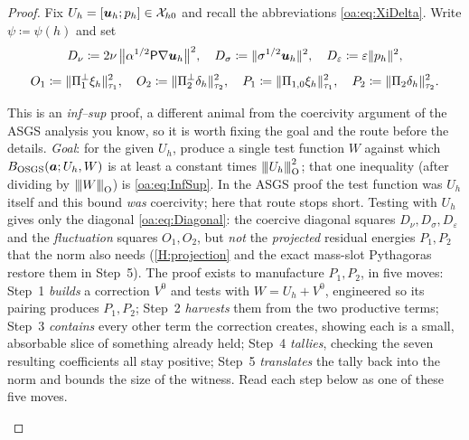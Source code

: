 \begin{proof}
Fix $U_h = [\boldsymbol{u}_h; p_h] \in \mathcal{X}_{h0}$ and recall the abbreviations \cref{oa:eq:XiDelta}.
Write $\psi \coloneqq \psi(h)$ and set
\[
  D_\nu \coloneqq 2\nu\,\bigl\lVert \alpha^{1/2}\mathsf{P}\nabla\boldsymbol{u}_h \bigr\rVert^2,
  \quad
  D_\sigma \coloneqq \lVert \sigma^{1/2}\boldsymbol{u}_h \rVert^2,
  \quad
  D_\varepsilon \coloneqq \varepsilon\lVert p_h \rVert^2,
\]
\[
  O_1 \coloneqq \lVert \Pi_{1}^{\perp}\xi_h \rVert_{\tau_1}^2,
  \quad
  O_2 \coloneqq \lVert \Pi_{2}^{\perp}\delta_h \rVert_{\tau_2}^2,
  \quad
  P_1 \coloneqq \lVert \Pi_{1,0}\xi_h \rVert_{\tau_1}^2,
  \quad
  P_2 \coloneqq \lVert \Pi_{2}\delta_h \rVert_{\tau_2}^2 .
\]

\begin{pedagogy}
This is an \emph{inf--sup} proof, a different animal from the coercivity
argument of the ASGS analysis you know, so it is worth fixing the goal and the
route before the details. \emph{Goal}: for the given $U_h$, produce a single
test function $W$ against which $B_{\mathrm{OSGS}}(\boldsymbol{a};U_h,W)$ is at least a
constant times ${\lvert\kern-0.25ex\lvert\kern-0.25ex\lvert U_h \rvert\kern-0.25ex\rvert\kern-0.25ex\rvert}_{\mathrm O}^2$; that one inequality (after dividing
by ${\lvert\kern-0.25ex\lvert\kern-0.25ex\lvert W \rvert\kern-0.25ex\rvert\kern-0.25ex\rvert}_{\mathrm O}$) is \cref{oa:eq:InfSup}. In the ASGS proof the test
function was $U_h$ itself and this bound \emph{was} coercivity; here that route
stops short. Testing with $U_h$ gives only the diagonal \cref{oa:eq:Diagonal}:
the coercive diagonal squares $D_\nu,D_\sigma,D_\varepsilon$ and the
\emph{fluctuation} squares $O_1,O_2$, but \emph{not} the \emph{projected}
residual energies $P_1,P_2$ that the norm also needs (\cref{H:projection} and the
exact mass-slot Pythagoras restore them in Step~5). The proof exists to
manufacture $P_1,P_2$, in five moves: Step~1 \emph{builds} a correction $V^0$ and
tests with $W=U_h+V^0$, engineered so its pairing produces $P_1,P_2$; Step~2
\emph{harvests} them from the two productive terms; Step~3 \emph{contains} every
other term the correction creates, showing each is a small, absorbable slice of
something already held; Step~4 \emph{tallies}, checking the seven resulting
coefficients all stay positive; Step~5 \emph{translates} the tally back into the
norm and bounds the size of the witness. Read each step below as one of these
five moves.
\end{pedagogy}


\end{proof}
